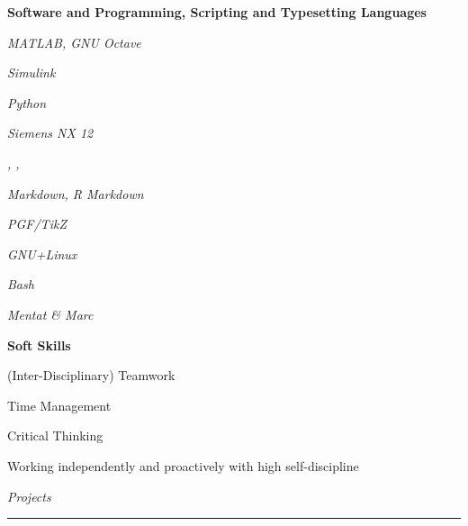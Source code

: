 \documentclass[12pt]{article}
\begin{document}
\textbf{Software and Programming, Scripting and Typesetting Languages}\\

\begin{multicols}{3}
\begin{compactitem}
    \item \textit{MATLAB, GNU Octave}
    \item \textit{Simulink}
    \item \textit{Python}
    \item \textit{Siemens NX 12}
    \item \textit{\LaTeXe, , }
    \item \textit{Markdown, R Markdown}
    \item \textit{PGF/TikZ}
    \item \textit{GNU+Linux}
    \item \textit{Bash}
    \item \textit{Mentat \& Marc}
\end{compactitem}
\end{multicols}


\textbf{Soft Skills}\\

\begin{multicols}{2}
\begin{compactitem}
    \item (Inter-Disciplinary) Teamwork
    \item Time Management
    \item Critical Thinking
    \item Working independently and proactively with high self-discipline
\end{compactitem}
\end{multicols}

\textit{\huge{Projects}} \\
\noindent\hfil\rule{\textwidth}{.4pt}\hfil
\end{document}
